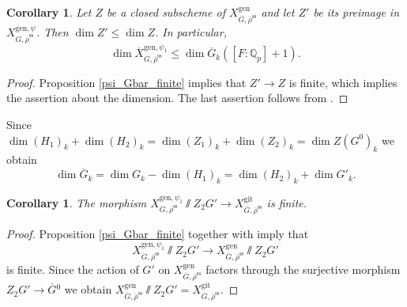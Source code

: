 \documentclass{amsart}
\newtheorem{cor}[prop]{Corollary}
\theoremstyle{definition}
\theoremstyle{remark}
\newcommand{\Qp}{\mathbb {Q}_p}
\newcommand{\rhobar}{\overline{\rho}}
\newcommand{\gen}{\mathrm{gen}}
\newcommand{\gps}{\mathrm{git}}
\newcommand{\Xbar}{\overline{X}}
\newcommand{\rhobarss}{\rhobar^{\mathrm{ss}}}
\newcommand{\Gbar}{\overline{G}}
\begin{document}
\begin{cor}\label{dim_bound_psi} Let $Z$ be a closed subscheme of $X^{\gen}_{\Gbar, \rhobarss}$ and 
let $Z'$ be its preimage in $X^{\gen, \psi}_{G,\rhobarss}$. Then $\dim Z'\le \dim Z$. In particular, 
$$\dim \Xbar^{\gen, \psi_1}_{G, \rhobarss} \le \dim \Gbar_k([F:\Qp]+1).$$
\end{cor}
\begin{proof} Proposition \ref{psi_Gbar_finite} implies that $Z'\rightarrow Z$ is finite, which implies the assertion about the dimension.
The last assertion follows from .
\end{proof} 
Since $\dim (H_1)_k+\dim (H_2)_k= \dim (Z_1)_k +\dim (Z_2)_k= \dim Z(G^0)_k$ we obtain
\begin{equation}\label{dim_Gbar}
\dim \Gbar_k = \dim G_k - \dim (H_1)_k = \dim (H_2)_k +\dim G'_k.
\end{equation}
\begin{cor}\label{psi_gps_finite} The morphism $X^{\gen, \psi_1}_{G, \rhobarss}\sslash Z_2 G' \rightarrow X^{\gps}_{\Gbar, \rhobarss}$ is finite.
\end{cor}
\begin{proof} Proposition \ref{psi_Gbar_finite} together with \cite[Theorem 2 (ii)]{seshadri} 
imply that $$X^{\gen, \psi_1}_{G, \rhobarss}\sslash Z_2G'\rightarrow X^{\gen}_{\Gbar, \rhobarss}\sslash Z_2G'$$
is finite. Since the  action of $G'$ on $X^{\gen}_{\Gbar, \rhobarss}$ factors through the 
surjective morphism $Z_2G'\rightarrow \Gbar{}^0$ we obtain $X^{\gen}_{\Gbar, \rhobarss}\sslash Z_2G'=X^{\gps}_{\Gbar, \rhobarss}$.
\end{proof}
\end{document}
